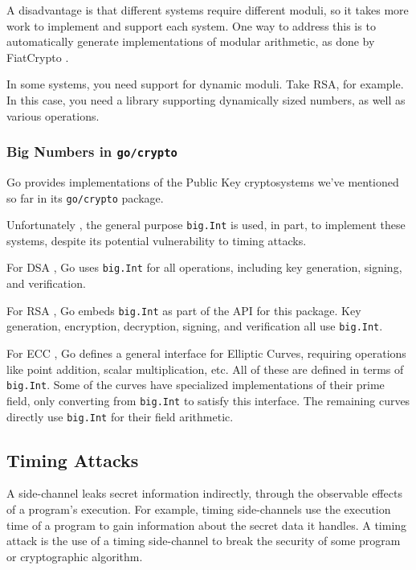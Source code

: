 \documentclass[11pt, a4paper]{article} %
\begin{document}
{A disadvantage is that different systems require different moduli,
so it takes more work to implement and support each system.
One way to address this is to automatically generate implementations
of modular arithmetic, as done by FiatCrypto
\cite{hvass_high-assurance_nodate}.

In some systems, you need support for dynamic moduli.
Take RSA, for example.
In this case, you need a library supporting dynamically
sized numbers, as well as various operations.

\subsubsection{Big Numbers in \texttt{go/crypto}}

Go provides implementations of the Public Key cryptosystems
we've mentioned so far in its \texttt{go/crypto} package.

Unfortunately \cite{ford_proposal_2017}, the general purpose
\texttt{big.Int} is used, in part, to implement these systems,
despite its potential vulnerability to timing attacks.

For DSA \cite{technology_digital_1994}, Go uses \texttt{big.Int}
for all operations, including key generation, signing, and verification.

For RSA \cite{rivest_method_1978}, Go embeds \texttt{big.Int}
as part of the API for
this package. Key generation, encryption, decryption, signing,
and verification all use \texttt{big.Int}.

For ECC \cite{miller_use_1986}, Go defines a general interface
for Elliptic Curves, requiring operations like point addition,
scalar multiplication, etc. All of these are defined in terms
of \texttt{big.Int}. Some of the curves have specialized
implementations of their prime field, only converting from
\texttt{big.Int} to satisfy this interface. The remaining curves
directly use \texttt{big.Int} for their field arithmetic.

\subsection{Timing Attacks}

A side-channel
\cite{kelsey_side_1998}
leaks secret information indirectly,
through the observable effects of a program's execution.
For example, timing side-channels use the execution time of a program
to gain information about the secret data it handles. 
A timing attack is the use of a timing side-channel to break the security
of some program or cryptographic algorithm.

}
\end{document}
